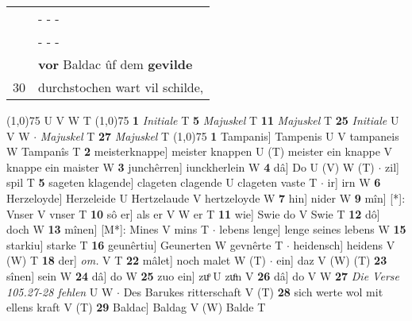 \documentclass[8pt,a4paper,notitlepage]{article}
\begin{document}
\begin{table}[ht]
\begin{minipage}[t]{0.5\linewidth}
\begin{tabular}{rl}
 & \multicolumn{1}{l}{ - - - }\\ 
 & \multicolumn{1}{l}{ - - - }\\ 
 & \textbf{vor} Baldac ûf dem \textbf{gevilde}\\ 
30 & durchstochen wart vil schilde,\\ 
\end{tabular}
\scriptsize
\line(1,0){75} \newline
U V W T \newline
\line(1,0){75} \newline
\textbf{1} \textit{Initiale} T  \textbf{5} \textit{Majuskel} T  \textbf{11} \textit{Majuskel} T  \textbf{25} \textit{Initiale} U V W   $\cdot$ \textit{Majuskel} T  \textbf{27} \textit{Majuskel} T  \newline
\line(1,0){75} \newline
\textbf{1} Tampanis] Tampenis U V tampaneis W Tampanîs T \textbf{2} meisterknappe] meister knappen U (T) meister ein knappe V knappe ein maister W \textbf{3} junchêrren] iunckherlein W \textbf{4} dâ] Do U (V) W (T)  $\cdot$ zil] spil T \textbf{5} sageten klagende] clageten clagende U clageten vaste T  $\cdot$ ir] irn W \textbf{6} Herzeloyde] Herzeleide U Hertzelaude V hertzeloyde W \textbf{7} hin] nider W \textbf{9} mîn] [*]: Vnser V vnser T \textbf{10} sô er] als er V W er T \textbf{11} wie] Swie do V Swie T \textbf{12} dô] doch W \textbf{13} mînen] [M*]: Mines V mins T  $\cdot$ lebens lenge] lenge seines lebens W \textbf{15} starkiu] starke T \textbf{16} geunêrtiu] Geunerten W gevnêrte T  $\cdot$ heidensch] heidens V (W) T \textbf{18} der] \textit{om.} V T \textbf{22} mâlet] noch malet W (T)  $\cdot$ ein] daz V (W) (T) \textbf{23} sînen] sein W \textbf{24} dâ] do W \textbf{25} zuo ein] zuͦ U zuͦn V \textbf{26} dâ] do V W \textbf{27} \textit{Die Verse 105.27-28 fehlen} U W   $\cdot$ Des Barukes ritterschaft V (T) \textbf{28} sich werte wol mit ellens kraft V (T) \textbf{29} Baldac] Baldag V (W) Balde T \newline
\end{minipage}
\end{table}
\end{document}
